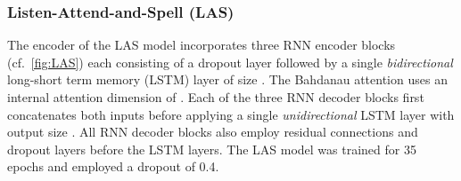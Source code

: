 \documentclass{article}
\begin{document}
\subsubsection{Listen-Attend-and-Spell (LAS)}\label{sec:LAS}	\vspace{-2.5mm}
The encoder of the LAS model incorporates three RNN encoder blocks (cf.~\ref{fig:LAS}) each consisting of a dropout layer followed by a single \textit{bidirectional} long-short term memory (LSTM) layer of size . The Bahdanau attention uses an internal attention dimension of . Each of the three RNN decoder blocks first concatenates both inputs before applying a single \textit{unidirectional} LSTM layer with output size . All RNN decoder blocks also employ residual connections and dropout layers before the LSTM layers. The LAS model was trained for 35 epochs and employed a dropout of 0.4.  
\vspace{-2mm}

\newcommand{\f}[1]{\textbf{#1}}
\newcommand{\s}[1]{\underline{#1}}
\renewcommand{\tabcolsep}{0.15cm}
\renewcommand{\arraystretch}{0.95}

\renewcommand{\l}[1]{\small\tt{#1}}
\end{document}
